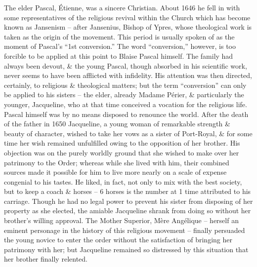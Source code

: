 \documentclass{article}
\begin{document}
\begin{enumerate}
\begin{itemize}
		The elder {\sc Pascal, \'Etienne}, was a sincere Christian. About 1646 he fell in with some representatives of the religious revival within the Church which has become known as Jansenism -- after Jansenius, Bishop of Ypres, whose theological work is taken as the origin of the movement. This period is usually spoken of as the moment of {\sc Pascal}'s ``1st conversion.'' The word ``conversion,'' however, is too forcible to be applied at this point to {\sc Blaise Pascal} himself. The family had always been devout, \& the young {\sc Pascal}, though absorbed in his scientific work, never seems to have been afflicted with infidelity. His attention was then directed, certainly, to religious \& theological matters; but the term ``conversion'' can only be applied to his sisters -- the elder, already Madame P\'erier, \& particularly the younger, {\sc Jacqueline}, who at that time conceived a vocation for the religious life. {\sc Pascal} himself was by no means disposed to renounce the world. After the death of the father in 1650 {\sc Jacqueline}, a young woman of remarkable strength \& beauty of character, wished to take her vows as a sister of Port-Royal, \& for some time her wish remained unfulfilled owing to the opposition of her brother. His objection was on the purely worldly ground that she wished to make over her patrimony to the Order; whereas while she lived with him, their combined sources made it possible for him to live more nearly on a scale of expense congenial to his tastes. He liked, in fact, not only to mix with the best society, but to keep a coach \& horses -- 6 horses is the number at 1 time attributed to his carriage. Though he had no legal power to prevent his sister from disposing of her property as she elected, the amiable {\sc Jacqueline} shrank from doing so without her brother's willing approval. The Mother Superior, M\`ere Ang\'elique -- herself an eminent personage in the history of this religious movement -- finally persuaded the young novice to enter the order without the satisfaction of bringing her patrimony with her; but {\sc Jacqueline} remained so distressed by this situation that her brother finally relented.
		

\end{itemize}
\end{enumerate}
\end{document}
